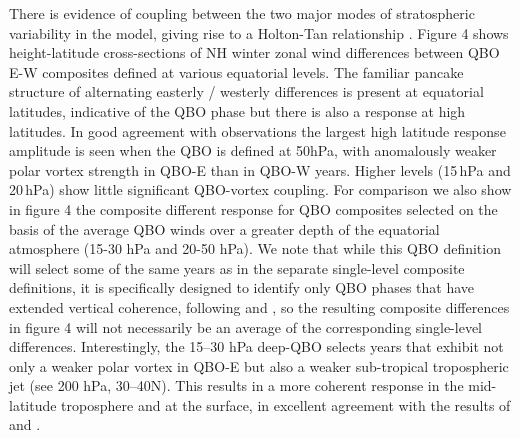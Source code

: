 \documentclass[wcd, manuscript]{copernicus}
\begin{document}


There is evidence of coupling between the two major modes of stratospheric variability in the model, giving rise to a Holton-Tan relationship \citep{Anstey20}. Figure 4 shows height-latitude cross-sections of NH winter zonal wind differences between QBO E-W composites defined at various equatorial levels. The familiar pancake structure of alternating easterly / westerly differences is present at equatorial latitudes, indicative of the QBO phase but there is also a response at high latitudes. In good agreement with observations the largest high latitude response amplitude is seen when  the QBO is defined at 50hPa, with anomalously weaker polar vortex strength in QBO-E than in QBO-W years. Higher levels (15\,hPa and 20\,hPa) show little significant QBO-vortex coupling. For comparison we also show in figure 4 the composite different response for QBO composites selected on the basis of the average QBO winds over a greater depth of the equatorial atmosphere (15-30 hPa and 20-50 hPa). We note that while this QBO definition will select some of the same years as in the separate single-level composite definitions, it is specifically designed to identify only QBO  phases that have extended vertical coherence, following \citep{Gray2018} and \cite{Andrews2019}, so the resulting composite  differences in figure 4 will not necessarily be an average of the corresponding single-level differences.   Interestingly, the 15--30 hPa deep-QBO selects years that exhibit not only a weaker polar vortex in QBO-E but also a weaker sub-tropical tropospheric jet (see 200 hPa, 30--40N). This results in a more coherent response in the mid-latitude troposphere and at the surface, in excellent agreement with the results of \cite{Gray2018} and \cite{Andrews2019}. 

\end{document}
